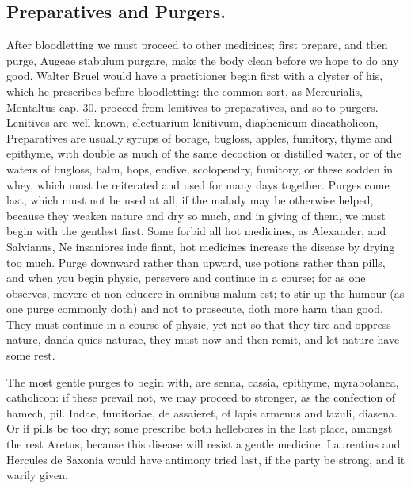 \subsection{Preparatives and Purgers.}

After bloodletting we must proceed to other medicines; first prepare,
and then purge, Augeae stabulum purgare, make the body clean before we
hope to do any good. Walter Bruel would have a practitioner begin first
with a clyster of his, which he prescribes before bloodletting: the
common sort, as Mercurialis, Montaltus cap. 30. \etc{} proceed from
lenitives to preparatives, and so to purgers. Lenitives are well known,
electuarium lenitivum, diaphenicum diacatholicon, \etc{} Preparatives are
usually syrups of borage, bugloss, apples, fumitory, thyme and
epithyme, with double as much of the same decoction or distilled water,
or of the waters of bugloss, balm, hops, endive, scolopendry, fumitory,
\etc{} or these sodden in whey, which must be reiterated and used for many
days together. Purges come last, which must not be used at all, if the
malady may be otherwise helped, because they weaken nature and dry so
much, and in giving of them,  we must begin with the gentlest
first. Some forbid all hot medicines, as Alexander, and Salvianus, \etc{}
Ne insaniores inde fiant, hot medicines increase the disease by
drying too much. Purge downward rather than upward, use potions rather
than pills, and when you begin physic, persevere and continue in a
course; for as one observes, movere et non educere in omnibus
malum est; to stir up the humour (as one purge commonly doth) and not
to prosecute, doth more harm than good. They must continue in a course
of physic, yet not so that they tire and oppress nature, danda quies
naturae, they must now and then remit, and let nature have some rest.

The most gentle purges to begin with, are senna, cassia,
epithyme, myrabolanea, catholicon: if these prevail not, we may proceed
to stronger, as the confection of hamech, pil. Indae, fumitoriae, de
assaieret, of lapis armenus and lazuli, diasena. Or if pills be too
dry; some prescribe both hellebores in the last place, amongst
the rest Aretus, because this disease will resist a gentle
medicine. Laurentius and Hercules de Saxonia would have antimony tried
last, if the party be strong, and it warily given.

